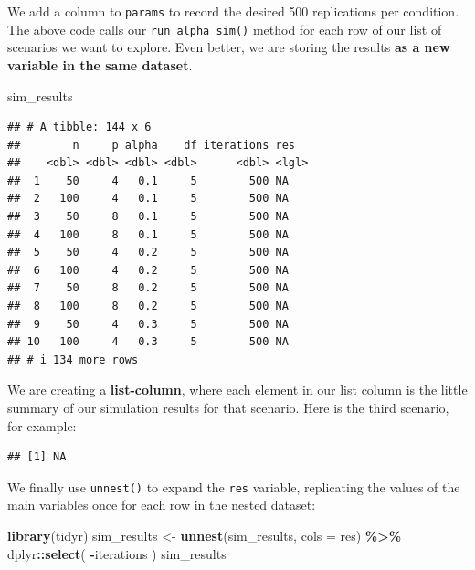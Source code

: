 \documentclass[
]{book}
\newenvironment{Shaded}{\begin{snugshade}}{\end{snugshade}}
\newcommand{\AttributeTok}[1]{\textcolor[rgb]{0.13,0.29,0.53}{#1}}
\newcommand{\DecValTok}[1]{\textcolor[rgb]{0.00,0.00,0.81}{#1}}
\newcommand{\FunctionTok}[1]{\textcolor[rgb]{0.13,0.29,0.53}{\textbf{#1}}}
\newcommand{\NormalTok}[1]{#1}
\newcommand{\OtherTok}[1]{\textcolor[rgb]{0.56,0.35,0.01}{#1}}
\newcommand{\SpecialCharTok}[1]{\textcolor[rgb]{0.81,0.36,0.00}{\textbf{#1}}}
\begin{document}
We add a column to \texttt{params} to record the desired 500 replications per condition.
The above code calls our \texttt{run\_alpha\_sim()} method for each row of our list of scenarios we want to explore.
Even better, we are storing the results \textbf{as a new variable in the same dataset}.

\begin{Shaded}
\begin{Highlighting}[]
\NormalTok{sim\_results}
\end{Highlighting}
\end{Shaded}

\begin{verbatim}
## # A tibble: 144 x 6
##        n     p alpha    df iterations res  
##    <dbl> <dbl> <dbl> <dbl>      <dbl> <lgl>
##  1    50     4   0.1     5        500 NA   
##  2   100     4   0.1     5        500 NA   
##  3    50     8   0.1     5        500 NA   
##  4   100     8   0.1     5        500 NA   
##  5    50     4   0.2     5        500 NA   
##  6   100     4   0.2     5        500 NA   
##  7    50     8   0.2     5        500 NA   
##  8   100     8   0.2     5        500 NA   
##  9    50     4   0.3     5        500 NA   
## 10   100     4   0.3     5        500 NA   
## # i 134 more rows
\end{verbatim}

We are creating a \textbf{list-column}, where each element in our list column is the little summary of our simulation results for that scenario.
Here is the third scenario, for example:

\begin{Shaded}
\end{Shaded}

\begin{verbatim}
## [1] NA
\end{verbatim}

We finally use \texttt{unnest()} to expand the \texttt{res} variable, replicating the values of the main variables once for each row in the nested dataset:

\begin{Shaded}
\begin{Highlighting}[]
\FunctionTok{library}\NormalTok{(tidyr)}
\NormalTok{sim\_results }\OtherTok{\textless{}{-}} \FunctionTok{unnest}\NormalTok{(sim\_results, }\AttributeTok{cols =}\NormalTok{ res) }\SpecialCharTok{\%\textgreater{}\%}
\NormalTok{  dplyr}\SpecialCharTok{::}\FunctionTok{select}\NormalTok{( }\SpecialCharTok{{-}}\NormalTok{iterations )}
\NormalTok{sim\_results}
\end{Highlighting}
\end{Shaded}
\end{document}
